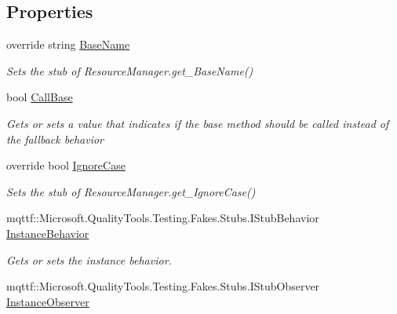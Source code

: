 \subsection*{Properties}
\begin{DoxyCompactItemize}
\item 
override string \hyperlink{class_system_1_1_resources_1_1_fakes_1_1_stub_resource_manager_a913da0855076dfbce9d74312c8abee49}{Base\-Name}
\begin{DoxyCompactList}\small\item\em Sets the stub of Resource\-Manager.\-get\-\_\-\-Base\-Name()\end{DoxyCompactList}\item 
bool \hyperlink{class_system_1_1_resources_1_1_fakes_1_1_stub_resource_manager_ac04a997d22a9d0b7720d1cada049090d}{Call\-Base}
\begin{DoxyCompactList}\small\item\em Gets or sets a value that indicates if the base method should be called instead of the fallback behavior\end{DoxyCompactList}\item 
override bool \hyperlink{class_system_1_1_resources_1_1_fakes_1_1_stub_resource_manager_a535fc71bed9718a32c2a5dff6a54eff5}{Ignore\-Case}
\begin{DoxyCompactList}\small\item\em Sets the stub of Resource\-Manager.\-get\-\_\-\-Ignore\-Case()\end{DoxyCompactList}\item 
mqttf\-::\-Microsoft.\-Quality\-Tools.\-Testing.\-Fakes.\-Stubs.\-I\-Stub\-Behavior \hyperlink{class_system_1_1_resources_1_1_fakes_1_1_stub_resource_manager_af627e585dc65987ccada62113ffe17ed}{Instance\-Behavior}
\begin{DoxyCompactList}\small\item\em Gets or sets the instance behavior.\end{DoxyCompactList}\item 
mqttf\-::\-Microsoft.\-Quality\-Tools.\-Testing.\-Fakes.\-Stubs.\-I\-Stub\-Observer \hyperlink{class_system_1_1_resources_1_1_fakes_1_1_stub_resource_manager_a15e93bce0dc0be2e9d55c00965d13778}{Instance\-Observer}

\end{DoxyCompactItemize}

